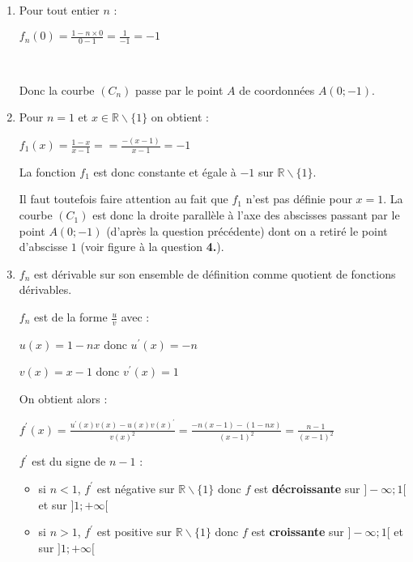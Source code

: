 \begin{corrige}
     \begin{enumerate}
          \item
{}
     Pour tout entier $n$ :
     \par
     $f_n(0)=\frac{1-n \times 0}{0-1}=\frac{1}{-1}=-1$
     \par
     ~
     \par
     Donc la courbe $(C_n)$ passe par le point $A$ de coordonnées $A(0;-1)$.
     \item
     Pour $n=1$ et $x \in \mathbb{R} \backslash \{1\}$ on obtient :
     \par
     $f_1(x)=\frac{1-x}{x-1}==\frac{-(x-1)}{x-1}=-1$
     \par
     La fonction $f_1$ est donc constante et égale à $-1$ sur $\mathbb{R} \backslash \{1\}$.
     \par
     Il faut toutefois faire attention au fait que $f_1$ n'est pas définie pour $x=1$. La courbe $(C_1)$ est donc la droite parallèle à l'axe des abscisses passant par le point $A(0;-1)$ (d'après la question précédente) dont on a retiré le point d'abscisse $1$ (voir figure à la question \textbf{4.}).
     \item
     $f_n$ est dérivable sur son ensemble de définition comme quotient de fonctions dérivables.
     \par
     $f_n$ est de la forme $\frac{u}{v}$ avec :
     \par
     $u(x)=1-nx$ donc $u^{\prime}(x)=-n$
     \par
     $v(x)=x-1$ donc $v^{\prime}(x)=1$
     \par
     On obtient alors :
     \par
     $f^{\prime}(x)=\frac{u^{\prime}(x)v(x)-u(x)v(x)^{\prime}}{v(x)^2}$$=\frac{-n(x-1)-(1-nx)}{(x-1)^2}=\frac{n-1}{(x-1)^2}$
     \par
     $f^{\prime}$ est du signe de $n-1$ :
     \begin{itemize}
          \item
          si $n  < 1$, $f^{\prime}$ est négative sur $\mathbb{R} \backslash \{1\}$ donc $f$ est \textbf{décroissante} sur $]-\infty ; 1[$ et sur $]1 ; +\infty[$
          \item
          si $n  > 1$, $f^{\prime}$ est positive sur $\mathbb{R} \backslash \{1\}$ donc $f$ est \textbf{croissante} sur $]-\infty ; 1[$ et sur $]1 ; +\infty[$

\end{itemize}$$
\end{enumerate}
\end{corrige}
